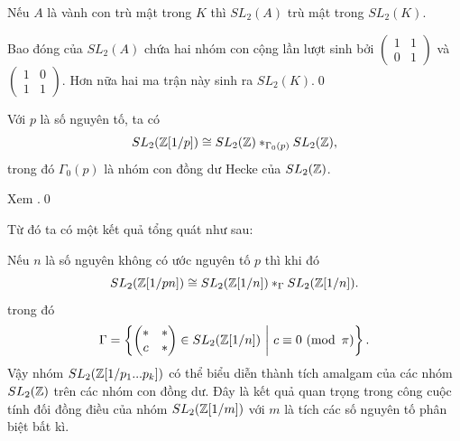 \begin{lemma}{\cite{TreeSerre}}
    Nếu $A$ là vành con trù mật trong $K$ thì $SL_2(A)$ trù mật trong $SL_2(K)$.
\end{lemma}
\startproof Bao đóng của $SL_2(A)$ chứa hai nhóm con cộng lần lượt sinh bởi $\begin{pmatrix}
        1 & 1 \\
        0 & 1
    \end{pmatrix}$ và $\begin{pmatrix}
        1 & 0 \\
        1 & 1
    \end{pmatrix}$. Hơn nữa hai ma trận này sinh ra $SL_2(K)$.\qed

\begin{corollary}\label{cor:amalgam-sl2-1p}
    Với $p$ là số nguyên tố, ta có
    $$
        SL_2(\mathbb Z[1/p]) \cong SL_2(\mathbb Z) *_{\Gamma_0(p)} SL_2(\mathbb Z),
    $$
    trong đó $\Gamma_0(p)$ là nhóm con đồng dư Hecke của $SL_2(\mathbb Z)$.
\end{corollary}

\startproof Xem \cite[Chương 2, Mục 1.4, Hệ quả 2]{TreeSerre}.\qed

Từ đó ta có một kết quả tổng quát như sau:

\begin{corollary}\label{cor:sl2-amalgam}
    Nếu $n$ là số nguyên không có ước nguyên tố $p$ thì khi đó
    $$
        SL_2(\mathbb Z[1/pn]) \cong SL_2(\mathbb Z[1/n]) *_{\Gamma} SL_2(\mathbb Z[1/n]).
    $$
    trong đó
    $$
        \Gamma = \left\{ \begin{pmatrix}
            * & * \\
            c & *
        \end{pmatrix} \in SL_2(\Z[1/n])\ \middle|\ c \equiv 0\ (\operatorname*{mod}\ \pi) \right\}.
    $$
    Vậy nhóm $SL_2(\mathbb Z[1/p_1...p_k])$ có thể biểu diễn thành tích amalgam của các nhóm $SL_2(\mathbb Z)$ trên các nhóm con đồng dư. Đây là kết quả quan trọng trong công cuộc tính đối đồng điều của nhóm $SL_2(\mathbb Z[1/m])$ với $m$ là tích các số nguyên tố phân biệt bất kì.
\end{corollary}